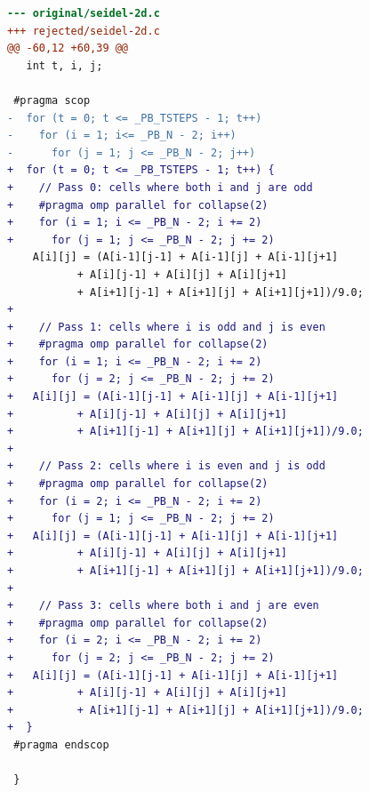 \begin{lstlisting}[language=diff,basicstyle=\ttfamily\scriptsize,breaklines=true,caption={polybench/seidel-2d — attempt 1 of 12, rejected by the gate at 'correctness': Program output changed for input '7' — the patched program is NOT semantically equivalent to the original. / This input differs from the one the profile was tak}]
--- original/seidel-2d.c
+++ rejected/seidel-2d.c
@@ -60,12 +60,39 @@
   int t, i, j;
 
 #pragma scop
-  for (t = 0; t <= _PB_TSTEPS - 1; t++)
-    for (i = 1; i<= _PB_N - 2; i++)
-      for (j = 1; j <= _PB_N - 2; j++)
+  for (t = 0; t <= _PB_TSTEPS - 1; t++) {
+    // Pass 0: cells where both i and j are odd
+    #pragma omp parallel for collapse(2)
+    for (i = 1; i <= _PB_N - 2; i += 2)
+      for (j = 1; j <= _PB_N - 2; j += 2)
 	A[i][j] = (A[i-1][j-1] + A[i-1][j] + A[i-1][j+1]
 		   + A[i][j-1] + A[i][j] + A[i][j+1]
 		   + A[i+1][j-1] + A[i+1][j] + A[i+1][j+1])/9.0;
+
+    // Pass 1: cells where i is odd and j is even
+    #pragma omp parallel for collapse(2)
+    for (i = 1; i <= _PB_N - 2; i += 2)
+      for (j = 2; j <= _PB_N - 2; j += 2)
+	A[i][j] = (A[i-1][j-1] + A[i-1][j] + A[i-1][j+1]
+		   + A[i][j-1] + A[i][j] + A[i][j+1]
+		   + A[i+1][j-1] + A[i+1][j] + A[i+1][j+1])/9.0;
+
+    // Pass 2: cells where i is even and j is odd
+    #pragma omp parallel for collapse(2)
+    for (i = 2; i <= _PB_N - 2; i += 2)
+      for (j = 1; j <= _PB_N - 2; j += 2)
+	A[i][j] = (A[i-1][j-1] + A[i-1][j] + A[i-1][j+1]
+		   + A[i][j-1] + A[i][j] + A[i][j+1]
+		   + A[i+1][j-1] + A[i+1][j] + A[i+1][j+1])/9.0;
+
+    // Pass 3: cells where both i and j are even
+    #pragma omp parallel for collapse(2)
+    for (i = 2; i <= _PB_N - 2; i += 2)
+      for (j = 2; j <= _PB_N - 2; j += 2)
+	A[i][j] = (A[i-1][j-1] + A[i-1][j] + A[i-1][j+1]
+		   + A[i][j-1] + A[i][j] + A[i][j+1]
+		   + A[i+1][j-1] + A[i+1][j] + A[i+1][j+1])/9.0;
+  }
 #pragma endscop
 
 }
\end{lstlisting}
